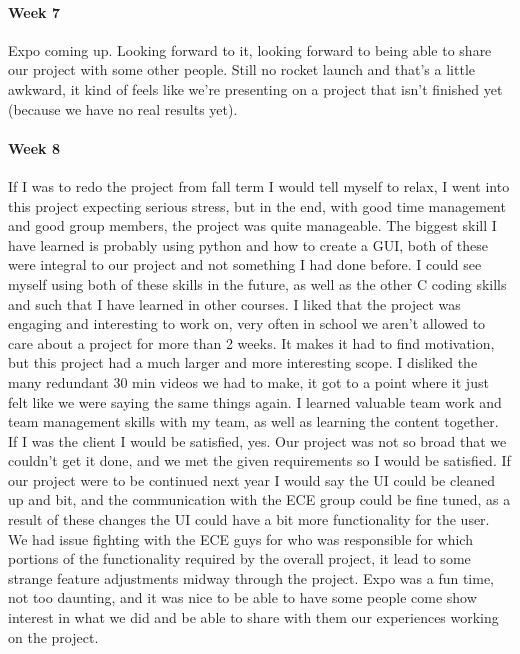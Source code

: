 \documentclass[10pt,draftclsnofoot,onecolumn,retainorgcmds]{IEEEtran}
\begin{document}
\paragraph{Week 7}
 Expo coming up. Looking forward to it, looking forward to being able to share our project with some other people. Still no rocket launch and that's a little awkward, it kind of feels like we're presenting on a project that isn't finished yet (because we have no real results yet).\\ 
\paragraph{Week 8}
If I was to redo the project from fall term I would tell myself to relax, I went into this project expecting serious stress, but in the end, with good time management and good group members, the project was quite manageable. The biggest skill I have learned is probably using python and how to create a GUI, both of these were integral to our project and not something I had done before. I could see myself using both of these skills in the future, as well as the other C coding skills and such that I have learned in other courses. I liked that the project was engaging and interesting to work on, very often in school we aren't allowed to care about a project for more than 2 weeks. It makes it had to find motivation, but this project had a much larger and more interesting scope. I disliked the many redundant 30 min videos we had to make, it got to a point where it just felt like we were saying the same things again. I learned valuable team work and team management skills with my team, as well as learning the content together. If I was the client I would be satisfied, yes. Our project was not so broad that we couldn't get it done, and we met the given requirements so I would be satisfied. If our project were to be continued next year I would say the UI could be cleaned up and bit, and the communication with the ECE group could be fine tuned, as a result of these changes the UI could have a bit more functionality for the user. We had issue fighting with the ECE guys for who was responsible for which portions of the functionality required by the overall project, it lead to some strange feature adjustments midway through the project. Expo was a fun time, not too daunting, and it was nice to be able to have some people come show interest in what we did and be able to share with them our experiences working on the project. \\
\end{document}
